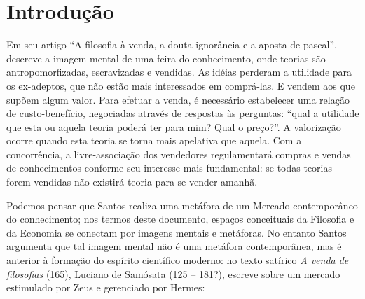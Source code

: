 \chapter*{Introdução} 


Em seu artigo ``A filosofia à venda, a douta ignorância e a aposta de pascal'',  descreve a imagem mental de uma feira do conhecimento, onde teorias  são antropomorfizadas, escravizadas e vendidas. As idéias perderam a utilidade para os ex-adeptos, que não estão mais interessados em comprá-las. E vendem aos que supõem algum valor. Para efetuar a venda, é necessário estabelecer uma relação de custo-benefício, negociadas através de respostas às perguntas: ``qual a utilidade que esta ou aquela teoria poderá ter para mim? Qual o preço?''. A valorização ocorre quando esta teoria se torna mais apelativa que aquela. Com a concorrência, a livre-associação dos vendedores regulamentará compras e vendas de conhecimentos conforme seu interesse mais fundamental: se todas teorias forem vendidas não existirá teoria para se vender amanhã. 

Podemos pensar que Santos realiza uma  metáfora de um Mercado contemporâneo do conhecimento; nos termos deste documento, espaços conceituais da Filosofia e da Economia se conectam por imagens mentais e metáforas. No entanto Santos argumenta que tal imagem mental não é uma metáfora contemporânea, mas é anterior à formação do espírito científico moderno: no texto satírico \emph{A venda de filosofias} (165), Luciano de Samósata (125 -- 181?), escreve sobre um mercado estimulado por Zeus e gerenciado por Hermes:

